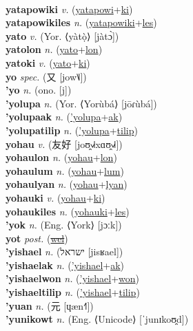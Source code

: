  \label{yatapowinules} \\
\textbf{yatapowiki} \textit{v.} (\hyperref[yatapowi]{yatapowi}+\hyperref[ki]{ki})
 \label{yatapowiki} \\
\textbf{yatapowikiles} \textit{n.} (\hyperref[yatapowiki]{yatapowiki}+\hyperref[les]{les})
 \label{yatapowikiles} \\
\textbf{yato} \textit{v.} (Yor. ⟨yàtọ̀⟩ [jàtɔ̀])
 \label{yato} \\
\textbf{yatolon} \textit{n.} (\hyperref[yato]{yato}+\hyperref[lon]{lon})
 \label{yatolon} \\
\textbf{yatoki} \textit{v.} (\hyperref[yato]{yato}+\hyperref[ki]{ki})
 \label{yatoki} \\
\textbf{yo} \textit{spec.} ({\chinese{}又} [jow˥˩])
 \label{yo} \\
\textbf{'yo} \textit{n.} (ono. [j])
 \label{'yo} \\
\textbf{'yolupa} \textit{n.} (Yor. ⟨Yorùbá⟩ [jōɾùbá])
 \label{'yolupa} \\
\textbf{'yolupaak} \textit{n.} (\hyperref['yolupa]{'yolupa}+\hyperref[ak]{ak})
 \label{'yolupaak} \\
\textbf{'yolupatilip} \textit{n.} (\hyperref['yolupa]{'yolupa}+\hyperref[tilip]{tilip})
 \label{'yolupatilip} \\
\textbf{yohau} \textit{v.} ({\chinese{}友好} [joʊ̯˧˩˧xɑʊ̯˧˩˧])
 \label{yohau} \\
\textbf{yohaulon} \textit{n.} (\hyperref[yohau]{yohau}+\hyperref[lon]{lon})
 \label{yohaulon} \\
\textbf{yohaulum} \textit{n.} (\hyperref[yohau]{yohau}+\hyperref[lum]{lum})
 \label{yohaulum} \\
\textbf{yohaulyan} \textit{n.} (\hyperref[yohau]{yohau}+\hyperref[lyan]{lyan})
 \label{yohaulyan} \\
\textbf{yohauki} \textit{v.} (\hyperref[yohau]{yohau}+\hyperref[ki]{ki})
 \label{yohauki} \\
\textbf{yohaukiles} \textit{n.} (\hyperref[yohauki]{yohauki}+\hyperref[les]{les})
 \label{yohaukiles} \\
\textbf{'yok} \textit{n.} (Eng. ⟨York⟩ [jɔːk])
 \label{'yok} \\
\textbf{yot} \textit{post.} (\hyperref[wel]{\sout{wel}})
 \label{yot} \\
\textbf{'yishael} \textit{n.} ({\hebrew{}ישראל} [jisʁael])
 \label{'yishael} \\
\textbf{'yishaelak} \textit{n.} (\hyperref['yishael]{'yishael}+\hyperref[ak]{ak})
 \label{'yishaelak} \\
\textbf{'yishaelwon} \textit{n.} (\hyperref['yishael]{'yishael}+\hyperref[won]{won})
 \label{'yishaelwon} \\
\textbf{'yishaeltilip} \textit{n.} (\hyperref['yishael]{'yishael}+\hyperref[tilip]{tilip})
 \label{'yishaeltilip} \\
\textbf{'yuan} \textit{n.} ({\chinese{}元} [ɥæn˧˥])
 \label{'yuan} \\
\textbf{'yunikowt} \textit{n.} (Eng. ⟨Unicode⟩ [ˈjunɪkoʊ̯d])
 \label{'yunikowt} 

